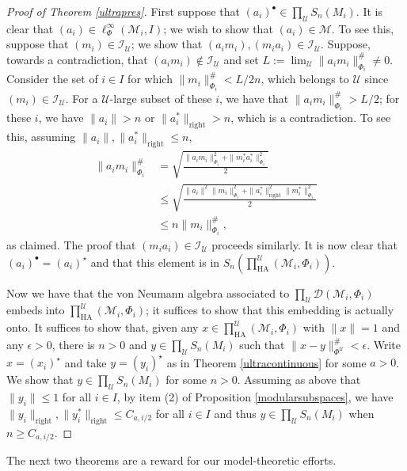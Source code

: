 \documentclass[12pt]{amsart}
\theoremstyle{definition}
\def\cal{\mathcal}
\newcommand\cU{{\cal U}}
\def \rt{\operatorname{right}}
\def \HA{\operatorname{HA}}
\begin{document}
\begin{proof} [Proof of Theorem \ref{ultrapres}]

First suppose that $(a_i)^\bullet \in \prod_\cU S_n(M_i)$.  It is clear that $(a_i) \in \ell_{\Phi}^\infty (\cal M_i,I)$; we wish to show that $(a_i)\in \cal M$.  To see this, suppose that $(m_i) \in \cal I_{\cU}$; we show that $(a_i m_i), (m_i a_i) \in \cal I_{\cU}$.  Suppose, towards a contradiction, that $(a_i m_i) \notin \cal I_{\cU}$ and set $L := \lim_\cU \|a_i m_i\|_{\Phi_i}^\# \neq 0$.  Consider the set of $i \in I$ for which $\|m_i\|_{\Phi_i}^\# < L/2n$, which belongs to $\cU$ since $(m_i) \in \cal I_{\cU}$.  For a $\cU$-large subset of these $i$, we have that $\|a_i m_i\|_{\Phi_i}^\# > L/2$; for these $i$, we have $\|a_i\| > n$ or $\|a_i^*\|_{\rt} > n$, which is a contradiction.  To see this, assuming $\|a_i\|, \|a_i^*\|_{\rt} \leq n$,
\begin{align}
    \|a_i m_i\|_{\Phi_i}^\# &= \sqrt{\frac{\|a_i m_i\|_{\Phi_i}^2 + \|m_i^* a_i^*\|_{\Phi_i}^2}{2}} \nonumber \\
    &\leq \sqrt{\frac{\|a_i\|^2 \|m_i\|_{\Phi_i}^2 + \|a_i^*\|_{\rt}^2 \|m_i^*\|_{\Phi_i}^2}{2}} \nonumber \\
    &\leq n\|m_i\|_{\Phi_i}^\#, \nonumber 
\end{align}
as claimed.  The proof that $(m_i a_i) \in \cal I_{\cU}$ proceeds similarly.  It is now clear that $(a_i)^\bullet = (a_i)^\star$ and that this element is in $S_{n}(\prod_{\HA}^{\cU}(\cal M_i,\Phi_i))$.

Now we have that the von Neumann algebra associated to $\prod_\cU \cal D(\cal M_i,\Phi_i)$ embeds into $\prod_{\HA}^{\cU} (\cal M_i, \Phi_i)$; it suffices to show that this embedding is actually onto.  It suffices to show that, given any $x \in \prod_{\HA}^{\cU} (\cal M_i,\Phi_i)$ with $\|x\| = 1$ and any $\epsilon > 0$, there is $n > 0$ and $y \in \prod_\cU S_n(M_i)$ such that $\|x-y\|^\#_{\Phi^\cU}< \epsilon$.  Write $x = (x_i)^\star$ and take $y = (y_i)^\star$ as in Theorem \ref{ultracontinuous} for some $a > 0$.  We show that $y \in \prod_\cU S_n(M_i)$ for some $n > 0$.  Assuming as above that $\|y_i\| \leq 1$ for all $i \in I$, by item (2) of Proposition \ref{modularsubspaces}, we have $\|y_i\|_{\rt}, \|y_i^*\|_{\rt} \leq C_{a,i/2}$ for all $i \in I$ and thus $y \in \prod_\cU S_n(M_i)$ when $n \geq C_{a,i/2}$.
\end{proof}

The next two theorems are a reward for our model-theoretic efforts.
\end{document}
